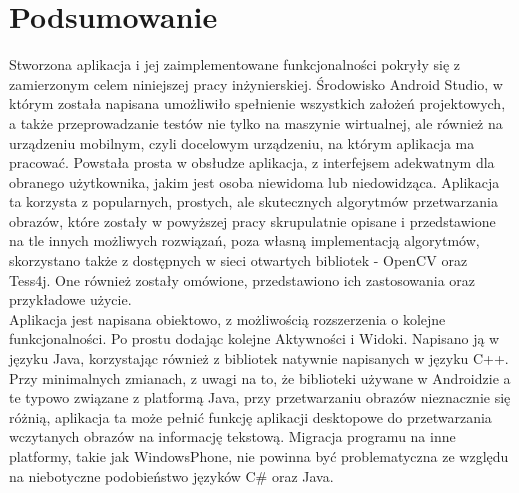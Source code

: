 \documentclass[eng,oneside]{mgr}
\begin{document}
\section{Podsumowanie}
Stworzona aplikacja i jej zaimplementowane funkcjonalności pokryły się z zamierzonym celem niniejszej pracy inżynierskiej. Środowisko Android Studio, w którym została napisana umożliwiło spełnienie wszystkich założeń projektowych, a także przeprowadzanie testów nie tylko na maszynie wirtualnej, ale również na urządzeniu mobilnym, czyli docelowym urządzeniu, na którym aplikacja ma pracować. Powstała prosta w obsłudze aplikacja, z interfejsem adekwatnym dla obranego użytkownika, jakim jest osoba niewidoma lub niedowidząca. Aplikacja ta korzysta z popularnych, prostych, ale skutecznych algorytmów przetwarzania obrazów, które zostały w powyższej pracy skrupulatnie opisane i przedstawione na tle innych możliwych rozwiązań, poza własną implementacją algorytmów, skorzystano także z dostępnych w sieci otwartych bibliotek - OpenCV oraz Tess4j. One również zostały omówione, przedstawiono ich zastosowania oraz przykładowe użycie.\\
Aplikacja jest napisana obiektowo, z możliwością rozszerzenia o kolejne funkcjonalności. Po prostu dodając kolejne Aktywności i Widoki. Napisano ją w języku Java, korzystając również z bibliotek natywnie napisanych w języku C++. Przy minimalnych zmianach, z uwagi na to, że biblioteki używane w Androidzie a te typowo związane z platformą Java, przy przetwarzaniu obrazów nieznacznie się różnią, aplikacja ta może pełnić funkcję aplikacji desktopowe do przetwarzania wczytanych obrazów na informację tekstową. Migracja programu na inne platformy, takie jak WindowsPhone, nie powinna być problematyczna ze względu na niebotyczne podobieństwo języków C\# oraz Java.
\end{document}
